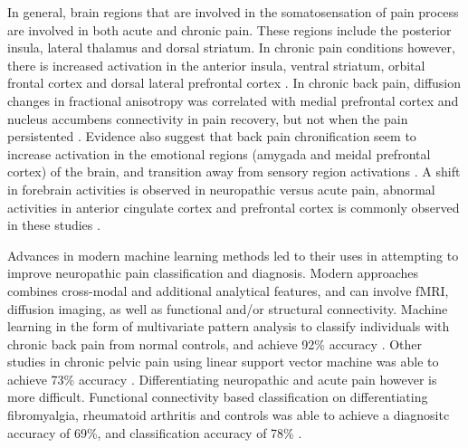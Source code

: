  In general, brain regions that are involved in the somatosensation of pain process are involved in both acute and chronic pain. These regions include the posterior insula, lateral thalamus and dorsal striatum. In chronic pain conditions however, there is increased activation in the anterior insula, ventral striatum, orbital frontal cortex and dorsal lateral prefrontal cortex \cite{Lorenz2005}. In chronic back pain, diffusion changes in fractional anisotropy was correlated with medial prefrontal cortex and nucleus accumbens connectivity in pain recovery, but not when the pain persistented \cite{Mansour2013}. Evidence also suggest that back pain chronification seem to increase activation in the emotional regions (amygada and meidal prefrontal cortex) of the brain, and transition away from sensory region activations \cite{Hashmi2013}. A shift in forebrain activities is observed in neuropathic versus acute pain, abnormal activities in anterior cingulate cortex and prefrontal cortex is commonly observed in these studies \cite{Davis2006}. 
 
 Advances in modern machine learning methods led to their uses in attempting to improve neuropathic pain classification and diagnosis. Modern approaches combines cross-modal and additional analytical features, and can involve fMRI, diffusion imaging, as well as functional and/or structural connectivity. Machine learning in the form of multivariate pattern analysis to classify individuals with chronic back pain from normal controls, and achieve 92\% accuracy \cite{Callan2014}. Other studies in chronic pelvic pain using linear support vector machine was able to achieve 73\% accuracy \cite{Bagarinao2014}. Differentiating neuropathic and acute pain however is more difficult. Functional connectivity based classification on differentiating fibromyalgia, rheumatoid arthritis and controls was able to achieve a diagnositc accuracy of 69\%, and classification accuracy of 78\% \cite{Sundermann2014}.    
 
 